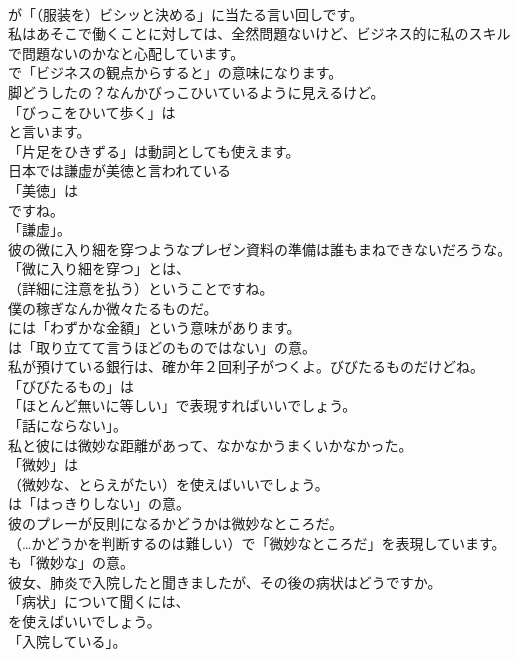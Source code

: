 \documentclass[8pt]{extreport}
\begin{document}
\begin{CJK}{UTF8}{min}
\\	が「（服装を）ビシッと決める」に当たる言い回しです。	
\\	私はあそこで働くことに対しては、全然問題ないけど、ビジネス的に私のスキルで問題ないのかなと心配しています。 
\\	で「ビジネスの観点からすると」の意味になります。	
\\	脚どうしたの？なんかびっこひいているように見えるけど。 
\\	「びっこをひいて歩く」は
\\	と言います。
\\	「片足をひきずる」は動詞としても使えます。	
\\	日本では謙虚が美徳と言われている 
\\	「美徳」は
\\	ですね。
\\	「謙虚」。	
\\	彼の微に入り細を穿つようなプレゼン資料の準備は誰もまねできないだろうな。 
\\	「微に入り細を穿つ」とは、
\\	（詳細に注意を払う）ということですね。	
\\	僕の稼ぎなんか微々たるものだ。 
\\	には「わずかな金額」という意味があります。
\\	は「取り立てて言うほどのものではない」の意。	
\\	私が預けている銀行は、確か年２回利子がつくよ。びびたるものだけどね。 
\\	「びびたるもの」は
\\	「ほとんど無いに等しい」で表現すればいいでしょう。
\\	「話にならない」。	
\\	私と彼には微妙な距離があって、なかなかうまくいかなかった。 
\\	「微妙」は 
\\	（微妙な、とらえがたい）を使えばいいでしょう。
\\	は「はっきりしない」の意。	
\\	彼のプレーが反則になるかどうかは微妙なところだ。 
\\	（…かどうかを判断するのは難しい）で「微妙なところだ」を表現しています。
\\	も「微妙な」の意。	
\\	彼女、肺炎で入院したと聞きましたが、その後の病状はどうですか。 
\\	「病状」について聞くには、
\\	を使えばいいでしょう。
\\	「入院している」。	

\end{CJK}
\end{document}
